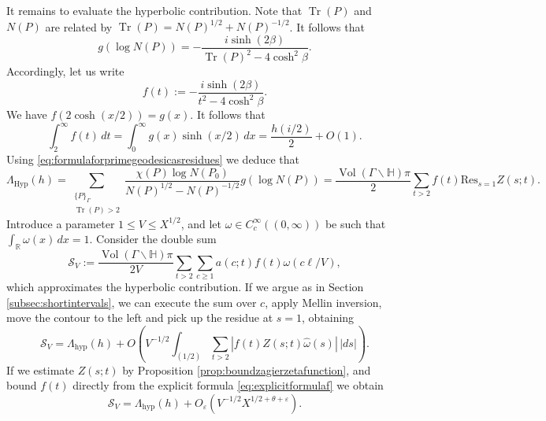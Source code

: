 \documentclass{article}
\theoremstyle{named}
\renewcommand{\S}{\mathcal{S}}
\newcommand{\Hyp}{\mathbb{H}}
\newcommand{\R}{\mathbb{R}}
\DeclareMathOperator{\vol}{Vol}
\DeclareMathOperator{\Tr}{Tr}
\begin{document}
It remains to evaluate the hyperbolic contribution. Note that $\Tr(P)$ and $N(P)$ are related by $\Tr(P) = N(P)^{1/2} + N(P)^{-1/2}$. It follows that 
\begin{equation*}
    g(\log N(P)) = -\frac{i\sinh(2\beta)}{\Tr(P)^2 - 4\cosh^2 \beta}.
\end{equation*}
Accordingly, let us write 
\begin{equation}\label{eq:explicitformulaf}
    f(t) := -\frac{i\sinh(2\beta)}{t^2 - 4\cosh^2 \beta}.
\end{equation}
We have $f(2\cosh(x/2)) = g(x)$. It follows that 
\begin{equation}\label{eq:preciseevaluationfintegral}
    \int_{2}^\infty f(t)\, dt = \int_0^\infty g(x) \sinh(x/2)\, dx = \frac{h(i/2)}{2} + O(1). 
\end{equation}
Using \eqref{eq:formulaforprimegeodesicasresidues} we deduce that
\begin{equation*}
    \Lambda_{\text{Hyp}}(h) = \sum_{\substack{\{P\}_\Gamma\\
    \Tr(P) > 2}} \frac{\chi(P)\log N(P_0)}{N(P)^{1/2} - N(P)^{-1/2}}g(\log N(P)) = \frac{\vol(\Gamma\backslash \Hyp) \pi}{2} \sum_{t > 2} f(t)\text{Res}_{s = 1}Z(s; t).
\end{equation*}
Introduce a parameter $1 \leq V \leq X^{1/2}$, and let $\omega \in C_c^\infty((0, \infty))$ be such that $\int_\R \omega(x) \, dx = 1$. Consider the double sum
\begin{equation}\label{eq:approximationtogeometricside}
    \S_V := \frac{\vol(\Gamma\backslash \Hyp)\pi}{2V}\sum_{t > 2}\sum_{c\geq 1} a(c; t)f(t)\omega(c \ell/V),
\end{equation}
which approximates the hyperbolic contribution. If we argue as in Section \ref{subsec:shortintervals}, we can execute the sum over $c$, apply Mellin inversion, move the contour to the left and pick up the residue at $s = 1$, obtaining
\begin{equation*}
    \S_V = \Lambda_{\text{hyp}}(h) + O\left(V^{-1/2}\int_{(1/2)} \sum_{t > 2}\left|f(t) Z(s; t) \widehat{\omega}(s)\right| \, |ds|\right).
\end{equation*}
If we estimate $Z(s; t)$ by Proposition \ref{prop:boundzagierzetafunction}, and bound $f(t)$ directly from the explicit formula \eqref{eq:explicitformulaf} we obtain
\begin{equation}\label{eq:approxtogeometricsidesumoverc}
    \S_V = \Lambda_{\text{hyp}}(h) + O_\varepsilon(V^{-1/2} X^{1/2 + \theta + \varepsilon}).
\end{equation}
\end{document}

